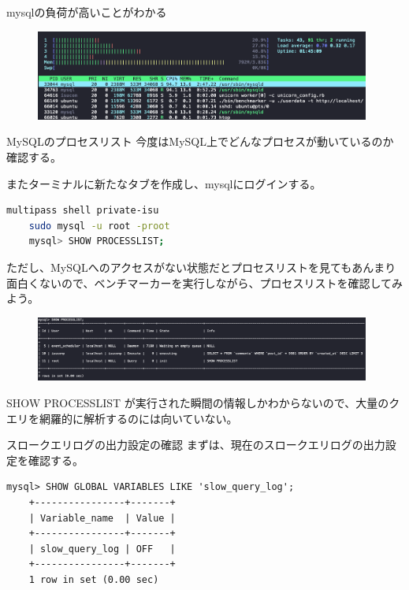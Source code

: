 \documentclass{beamer}
\begin{document}
\begin{frame}
  mysqlの負荷が高いことがわかる
  \begin{figure}
    \centering
    \includegraphics[clip, keepaspectratio, width=110mm]{./fig/htop.png}
  \end{figure}
\end{frame}

\begin{frame}[fragile]{MySQLのプロセスリスト}
  今度はMySQL上でどんなプロセスが動いているのか確認する。\par
  またターミナルに新たなタブを作成し、mysqlにログインする。
  \begin{lstlisting}[language=bash]
    multipass shell private-isu
    sudo mysql -u root -proot
    mysql> SHOW PROCESSLIST;
  \end{lstlisting}
  ただし、MySQLへのアクセスがない状態だとプロセスリストを見てもあんまり面白くないので、ベンチマーカーを実行しながら、プロセスリストを確認してみよう。
\end{frame}

\begin{frame}
  \begin{figure}
    \centering
    \includegraphics[clip, keepaspectratio, width=110mm]{./fig/mysql_process_list.png}
  \end{figure}
  SHOW PROCESSLIST が実行された瞬間の情報しかわからないので、大量のクエリを網羅的に解析するのには向いていない。
\end{frame}

\begin{frame}[fragile]{スロークエリログの出力設定の確認}
  まずは、現在のスロークエリログの出力設定を確認する。\par
  \begin{lstlisting}[basicstyle=\tiny]
    mysql> SHOW GLOBAL VARIABLES LIKE 'slow_query_log';
    +----------------+-------+
    | Variable_name  | Value |
    +----------------+-------+
    | slow_query_log | OFF   |
    +----------------+-------+
    1 row in set (0.00 sec)
  \end{lstlisting}
\end{frame}
\end{document}
